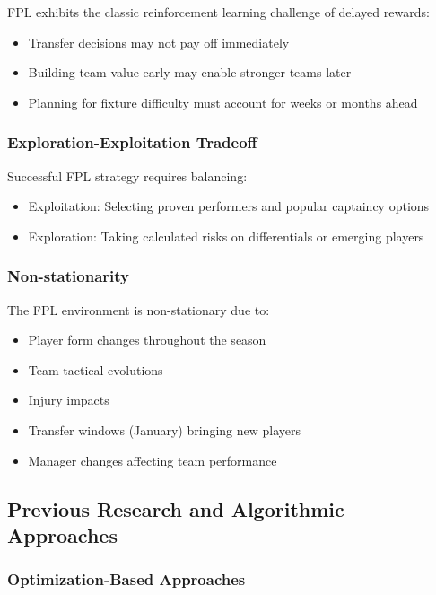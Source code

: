 FPL exhibits the classic reinforcement learning challenge of delayed rewards:
\begin{itemize}
    \item Transfer decisions may not pay off immediately
    \item Building team value early may enable stronger teams later
    \item Planning for fixture difficulty must account for weeks or months ahead \cite{silver2017}
\end{itemize}

\subsubsection{Exploration-Exploitation Tradeoff}

Successful FPL strategy requires balancing:
\begin{itemize}
    \item Exploitation: Selecting proven performers and popular captaincy options
    \item Exploration: Taking calculated risks on differentials or emerging players \cite{matthews2019}
\end{itemize}

\subsubsection{Non-stationarity}

The FPL environment is non-stationary due to:
\begin{itemize}
    \item Player form changes throughout the season
    \item Team tactical evolutions
    \item Injury impacts
    \item Transfer windows (January) bringing new players
    \item Manager changes affecting team performance \cite{dixon1997}
\end{itemize}

\subsection{Previous Research and Algorithmic Approaches}

\subsubsection{Optimization-Based Approaches}

